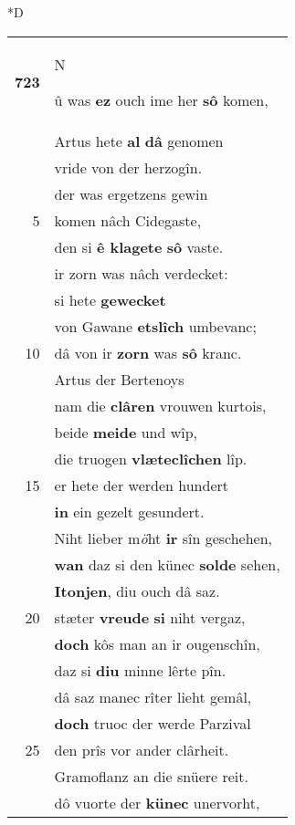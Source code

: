 \documentclass[8pt,a4paper,notitlepage]{article}
\begin{document}
\begin{table}[ht]
\begin{minipage}[t]{0.5\linewidth}
\small
\begin{center}*D
\end{center}
\begin{tabular}{rl}
\textbf{723} & \begin{large}N\end{large}û was \textbf{ez} ouch ime her \textbf{sô} komen,\\ 
 & Artus hete \textbf{al} \textbf{dâ} genomen\\ 
 & vride von der herzogîn.\\ 
 & der was ergetzens gewin\\ 
5 & komen nâch Cidegaste,\\ 
 & den si \textbf{ê klagete} \textbf{sô} vaste.\\ 
 & ir zorn was nâch verdecket:\\ 
 & si hete \textbf{gewecket}\\ 
 & von Gawane \textbf{etslîch} umbevanc;\\ 
10 & dâ von ir \textbf{zorn} was \textbf{sô} kranc.\\ 
 & Artus der Bertenoys\\ 
 & nam die \textbf{clâren} vrouwen kurtois,\\ 
 & beide \textbf{meide} und wîp,\\ 
 & die truogen \textbf{vlæteclîchen} lîp.\\ 
15 & er hete der werden hundert\\ 
 & \textbf{in} ein gezelt gesundert.\\ 
 & Niht lieber m\textit{ö}ht \textbf{ir} sîn geschehen,\\ 
 & \textbf{wan} daz si den künec \textbf{solde} sehen,\\ 
 & \textbf{Itonjen}, diu ouch dâ saz.\\ 
20 & stæter \textbf{vreude} \textbf{si} niht vergaz,\\ 
 & \textbf{doch} kôs man an ir ougenschîn,\\ 
 & daz si \textbf{diu} minne lêrte pîn.\\ 
 & dâ saz manec rîter lieht gemâl,\\ 
 & \textbf{doch} truoc der werde Parzival\\ 
25 & den prîs vor ander clârheit.\\ 
 & Gramoflanz an die snüere reit.\\ 
 & dô vuorte der \textbf{künec} unervorht,\\ 

\end{tabular}
\end{minipage}
\end{table}
\end{document}
